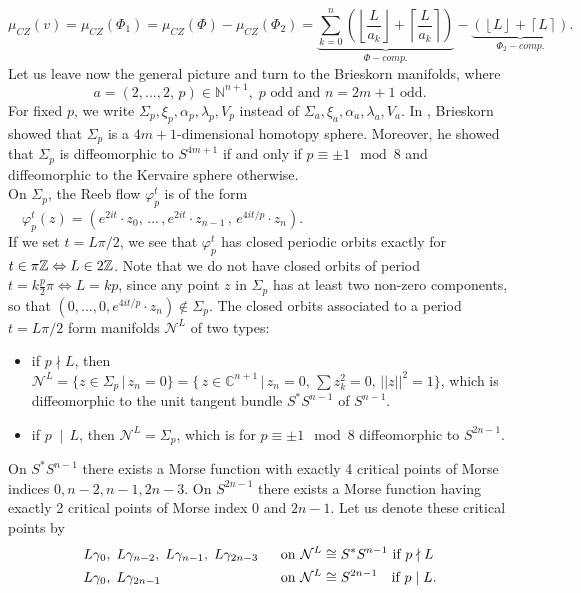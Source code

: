 \documentclass[a4paper,12pt,bibliography=totocnumbered,titlepage=false,abstracton,bookmarksnumbered=true]{scrartcl}
\theoremstyle{definition}
\begin{document}
\begin{equation}\label{eqConZeh}
 \mu_{CZ}(v)=\mu_{CZ}(\Phi_1) = \mu_{CZ}(\Phi)-\mu_{CZ}(\Phi_2) =\underbrace{\sum_{k=0}^n\left(\left\lfloor\frac{L}{a_k}\right\rfloor {+} \left\lceil\frac{L}{a_k}\right\rceil\right)}_{\Phi - comp.} - \underbrace{\left(\left\lfloor L\right\rfloor {+} \left\lceil L\right\rceil\right)}_{\Phi_2-comp.}.
\end{equation}
Let us leave now the general picture and turn to the Brieskorn manifolds, where
\[a=(2,...,2,\,p)\in\mathbb{N}^{n+1},\; p \text{ odd and } n=2m{+}1 \text{ odd.}\]
For fixed $p$, we write $\Sigma_p, \xi_p, \alpha_p,\lambda_p, V_p$ instead of $\Sigma_a, \xi_a, \alpha_a, \lambda_a, V_a$. In \cite{Brie}, Brieskorn showed that $\Sigma_p$ is a $4m{+}1$-dimensional homotopy sphere. Moreover, he showed that $\Sigma_p$ is diffeomorphic to $S^{4m+1}$ if and only if $p\equiv \pm 1\mod 8$ and diffeomorphic to the Kervaire sphere otherwise.\bigskip\\
On $\Sigma_p$, the Reeb flow $\varphi_p^t$ is of the form $\quad \displaystyle \varphi^t_p(z)=\left(e^{2it}{\cdot} z_0,\,...\,,e^{2it}{\cdot} z_{n-1}\,,\,e^{4it/p}{\cdot} z_n\right)$.\bigskip\\
If we set $t=L\pi/2$, we see that $\varphi^t_p$ has closed periodic orbits exactly for $t\in\pi\mathbb{Z}\Leftrightarrow\linebreak L\in2\mathbb{Z}$. Note that we do not have closed orbits of period $t=k\frac{p}{2}\pi\Leftrightarrow L=kp$, since any point $z$ in $\Sigma_p$ has at least two non-zero components, so that $(0,...,0, e^{4it/p}{\cdot} z_n)\not\in\Sigma_p$. The closed orbits associated to a period $t=L\pi/2$ form manifolds $\mathcal{N}^L$ of two types:
\begin{itemize}
 \item if $p\nmid L$, then $\mathcal{N}^L=\big\{z{\in}\Sigma_p\,\big|\,z_n{=}0\big\}=\big\{\,z{\in}\mathbb{C}^{n+1}\,\big|\,z_n{=}0,\,\sum z_k^2{=}0,\,||z||^2{=}1\big\}$, which is diffeomorphic to the unit tangent bundle $S^\ast S^{n-1}$ of $S^{n-1}$.
 \item if $p\;{\mid}\, L$, then $\mathcal{N}^L=\Sigma_p$, which is for $p\equiv \pm 1\mod 8$ diffeomorphic to $S^{2n-1}$.
\end{itemize}
On $S^\ast S^{n-1}$ there exists a Morse function with exactly 4 critical points of Morse indices $0, n{-}2,n{-}1, 2n{-}3$. On $S^{2n-1}$ there exists a Morse function having exactly 2 critical points of Morse index 0 and $2n{-}1$. Let us denote these critical points by
\begin{align*}
 &L\gamma_0,\; L\gamma_{n-2},\; L\gamma_{n-1},\; L\gamma_{2n-3}\; &&\text{ on $\mathcal{N}^L\cong S^\ast S^{n-1} $ if $ p\nmid L$}\\
 &L\gamma_0,\; L\gamma_{2n-1}&&\text{ on $\mathcal{N}^L\cong S^{2n-1}\phantom{S} $ if $ p\mid L$.} 
\end{align*}
\end{document}
